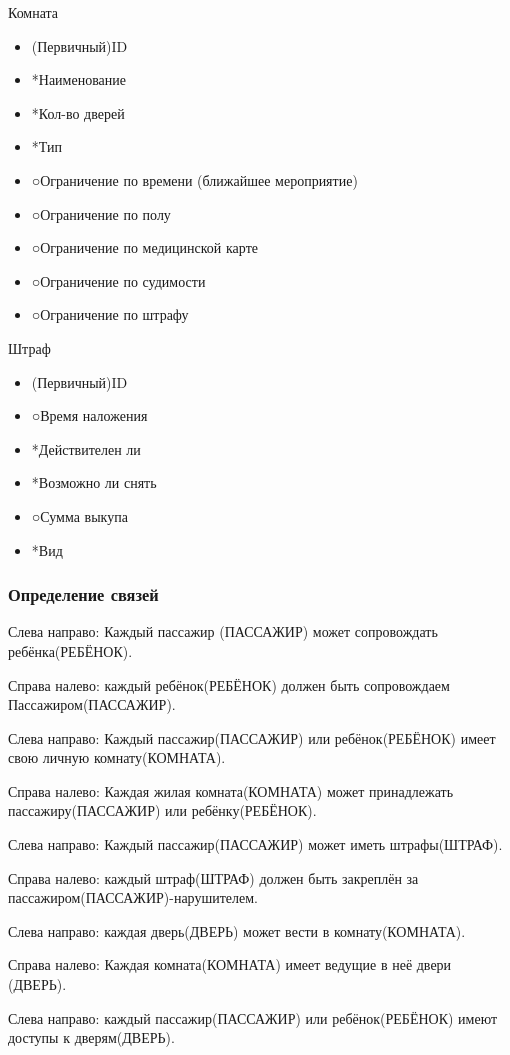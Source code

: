 Комната
\begin{itemize}
	\item (Первичный)ID
	\item *Наименование
	\item *Кол-во дверей
	\item *Тип
	\item ○Ограничение по времени (ближайшее мероприятие)
	\item ○Ограничение по полу
	\item ○Ограничение по медицинской карте
	\item ○Ограничение по судимости
	\item ○Ограничение по штрафу	
\end{itemize}

Штраф
\begin{itemize}
	\item (Первичный)ID
	\item ○Время наложения
	\item *Действителен ли
	\item *Возможно ли снять
	\item ○Сумма выкупа
	\item *Вид
	
\end{itemize}

\subsubsection{Определение связей}

Слева направо: Каждый пассажир (ПАССАЖИР) может сопровождать ребёнка(РЕБЁНОК).

Справа налево: каждый ребёнок(РЕБЁНОК) должен быть сопровождаем Пассажиром(ПАССАЖИР).

Слева направо: Каждый пассажир(ПАССАЖИР) или ребёнок(РЕБЁНОК) имеет свою личную комнату(КОМНАТА).

Справа налево: Каждая жилая комната(КОМНАТА) может принадлежать пассажиру(ПАССАЖИР) или ребёнку(РЕБЁНОК). 

Слева направо: Каждый пассажир(ПАССАЖИР) может иметь штрафы(ШТРАФ).

Справа налево: каждый штраф(ШТРАФ) должен быть закреплён за  пассажиром(ПАССАЖИР)-нарушителем.

Слева направо: каждая дверь(ДВЕРЬ) может вести в комнату(КОМНАТА).

Справа налево: Каждая комната(КОМНАТА) имеет ведущие в неё двери (ДВЕРЬ).

Слева направо: каждый пассажир(ПАССАЖИР) или ребёнок(РЕБЁНОК) имеют доступы к дверям(ДВЕРЬ).

